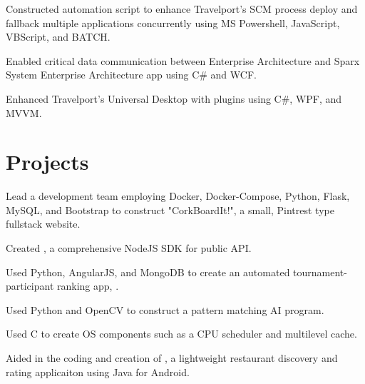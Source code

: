 \documentclass[]{deedy-resume-openfont}
\begin{document}
\begin{minipage}[t]{0.66\textwidth}
\begin{tightemize}
\item Constructed automation script to enhance Travelport's SCM process deploy and fallback multiple applications concurrently using MS Powershell, JavaScript, VBScript, and BATCH.
\item Enabled critical data communication between Enterprise Architecture and Sparx System Enterprise Architecture app using C\# and WCF.
\item Enhanced Travelport's Universal Desktop with plugins using C\#, WPF, and MVVM.
\end{tightemize}
\sectionsep


\section{Projects}
\begin{tightemize} 
\item Lead a development team employing Docker, Docker-Compose, Python, Flask, MySQL, and Bootstrap to construct "CorkBoardIt!", a small, Pintrest type fullstack website. 
\item Created \href{http://npmjs.com/package/smashgg.js}{}, a comprehensive NodeJS SDK for \href{www.smash.gg}{} public API. 
\item Used Python, AngularJS, and MongoDB to create an automated tournament-participant ranking app, \href{https://notgarpr.com}{}.
\item Used Python and OpenCV to construct a pattern matching AI program.
\item Used C to create OS components such as a CPU scheduler and multilevel cache.
\item Aided in the coding and creation of \href{https://play.google.com/store/apps/details?id=com.gmail.japa.arialdis.tasteslikechickenlite\&hl=en}{}, a lightweight restaurant discovery and rating applicaiton using Java for Android.
\end{tightemize}
\sectionsep





\end{minipage} 
\end{document}
